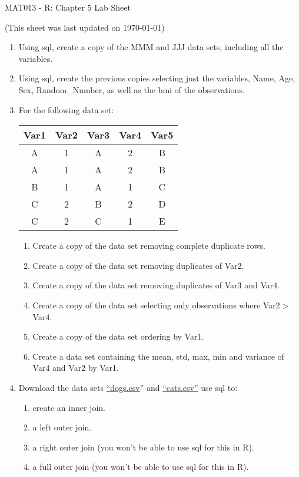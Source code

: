 \documentclass[12pt]{article}
\begin{document}
\begin{center}
\huge{MAT013 - R: Chapter 5 Lab Sheet}\\
\begin{center}
\tiny{(This sheet was last updated on \today)}
\end{center}
\end{center}

\begin{enumerate}
\item Using sql, create a copy of the MMM and JJJ data sets, including all the variables.
\item Using sql, create the previous copies selecting just the variables, Name, Age, Sex, Random\_Number, as well as the bmi of the observations.
\item For the following data set:
\begin{center}
\begin{tabular}{|c|c|c|c|c|}
\hline
Var1&Var2&Var3&Var4&Var5\\\hline\hline
A&1&A&2&B\\\hline
A&1&A&2&B\\\hline
B&1&A&1&C\\\hline
C&2&B&2&D\\\hline
C&2&C&1&E\\\hline
\end{tabular}
\end{center}
\begin{enumerate}
\item Create a copy of the data set removing complete duplicate rows.
\item Create a copy of the data set removing duplicates of Var2.
\item Create a copy of the data set removing duplicates of Var3 and Var4. 
\item Create a copy of the data set selecting only observations where Var2$>$Var4.
\item Create a copy of the data set ordering by Var1.
\item Create a data set containing the mean, std, max, min and variance of Var4 and Var2 by Var1.
\end{enumerate}
\item Download the data sets \href{https://docs.google.com/file/d/0Bx_zrw5uAafbekVHY0tLMlJydzA/edit}{ ``dogs.csv}'' and \href{https://docs.google.com/file/d/0Bx_zrw5uAafbVzNLeVNDSXNiSkU/edit}{``cats.csv''} use sql to:
\begin{enumerate}
\item create an inner join.
\item a left outer join.
\item a right outer join (you won't be able to use sql for this in R).
\item a full outer join (you won't be able to use sql for this in R).
\end{enumerate}
\end{enumerate}
\end{document}

